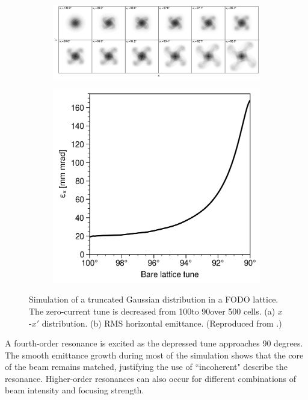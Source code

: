 \begin{figure}[!p]
    \centering
    \vspace*{2cm}
    \begin{subfigure}{\textwidth}
        \includegraphics[width=\textwidth]{Images/chapter1/incoherent_resonance_fourth_order.png}
        \label{fig:incoherent_instability_a}
        \caption{}
    \end{subfigure}
    \begin{subfigure}{0.5\textwidth}
        \includegraphics[width=\textwidth]{Images/chapter1/incoherent_resonance_fourth_order_emittance.png}
        \label{fig:incoherent_instability_b}
        \caption{}
    \end{subfigure}
    \caption{Simulation of a truncated Gaussian distribution in a FODO lattice. The zero-current tune is decreased from 100\degree to 90\degree over 500 cells. (a) $x$-$x'$ distribution. (b) RMS horizontal emittance. (Reproduced from \cite{Hofmann2017Book}.)}
    \label{fig:incoherent_instability}
    \vspace*{2cm}
\end{figure}
%
A fourth-order resonance is excited as the depressed tune approaches 90 degrees. The smooth emittance growth during most of the simulation shows that the core of the beam remains matched, justifying the use of ``incoherent" describe the resonance. Higher-order resonances can also occur for different combinations of beam intensity and focusing strength.





